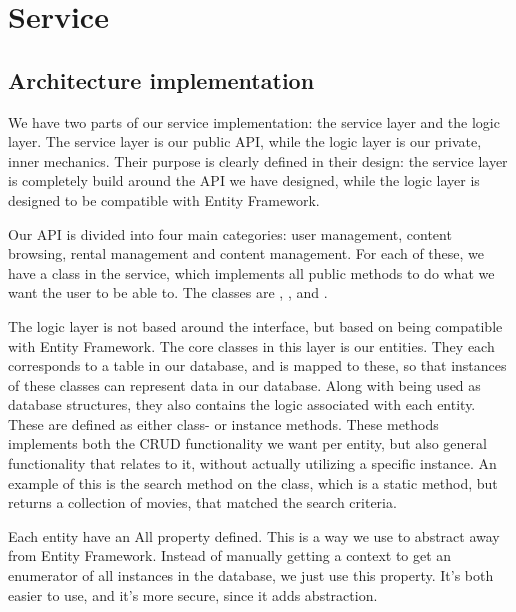 \section{Service}
\label{Implementation_Service}

\subsection[Architecture]{Architecture implementation}
\label{Implementation_Service_Architecture}
We have two parts of our service implementation: the service layer and the logic layer. The service layer is our public API, while the logic layer is our private, inner mechanics. Their purpose is clearly defined in their design: the service layer is completely build around the API we have designed, while the logic layer is designed to be compatible with Entity Framework. 

Our API is divided into four main categories: user management, content browsing, rental management and content management. For each of these, we have a class in the service, which implements all public methods to do what we want the user to be able to. The classes are , ,  and . 

The logic layer is not based around the interface, but based on being compatible with Entity Framework. The core classes in this layer is our entities. They each corresponds to a table in our database, and is mapped to these, so that instances of these classes can represent data in our database. Along with being used as database structures, they also contains the logic associated with each entity. These are defined as either class- or instance methods. These methods implements both the CRUD functionality we want per entity, but also general functionality that relates to it, without actually utilizing a specific instance. An example of this is the search method on the  class, which is a static method, but returns a collection of movies, that matched the search criteria. 

Each entity have an All property defined. This is a way we use to abstract away from Entity Framework. Instead of manually getting a context to get an enumerator of all instances in the database, we just use this property. It's both easier to use, and it's more secure, since it adds abstraction. 

